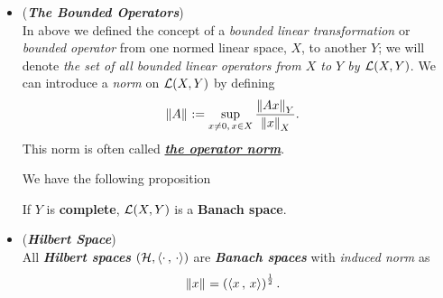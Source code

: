 \documentclass[11pt]{article}
\begin{document}
\begin{itemize}
\item \begin{example}(\emph{\textbf{The Bounded Operators}})\\
In above we defined the concept of a \emph{bounded linear transformation} or \emph{bounded operator} from one normed linear space, $X$, to another $Y$; we will denote \emph{the set of all bounded linear operators from $X$ to $Y$ by ${\mathcal L}(X, Y)$}. We can introduce a \emph{norm} on  ${\mathcal L}(X, Y)$ by defining
\begin{align*}
\left\|A\right\|_{} &:= \sup_{x \neq 0, \, x \in X} \frac{\left\|Ax\right\|_{Y}}{\left\|x\right\|_{X}}.
\end{align*}
This norm is often called \underline{\emph{\textbf{the operator norm}}}.

We have the following proposition
\begin{proposition} \label{prop: bounded_operator_banach}
If $Y$ is \textbf{complete}, ${\mathcal L}(X, Y)$ is a \textbf{Banach space}.
\end{proposition}
\end{example}

\item \begin{example} (\emph{\textbf{Hilbert Space}})\\
All \emph{\textbf{Hilbert spaces}} $({\mathcal H}, \left\langle \cdot\,,\, \cdot \right\rangle)$ are \textbf{\emph{Banach spaces}} with \emph{induced norm} as
\begin{align*}
\left\|x\right\|_{} &= \left(\left\langle x\,,\, x \right\rangle\right)^{\frac{1}{2}}.
\end{align*} 
\end{example}
\end{itemize}
\end{document}

